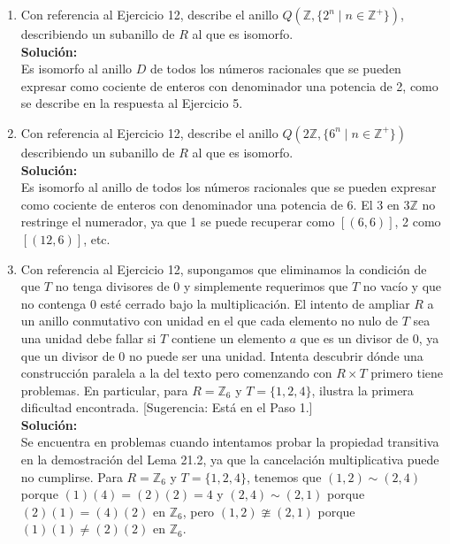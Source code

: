 \begin{enumerate}
	\item Con referencia al Ejercicio 12, describe el anillo \(Q(\mathbb{Z}, \{2^{n} \mid n \in \mathbb{Z}^+\})\), describiendo un subanillo de \(R\) al que es isomorfo.
	\\ \textbf{Solución:} \\
	Es isomorfo al anillo \(D\) de todos los números racionales que se pueden expresar como cociente de enteros con denominador una potencia de 2, como se describe en la respuesta al Ejercicio 5.
	
	\item Con referencia al Ejercicio 12, describe el anillo \(Q(2\mathbb{Z}, \{6^n \mid n \in \mathbb{Z}^+\})\) describiendo un subanillo de \(R\) al que es isomorfo.
	\\ \textbf{Solución:} \\
	Es isomorfo al anillo de todos los números racionales que se pueden expresar como cociente de enteros con denominador una potencia de 6. El 3 en \(3\mathbb{Z}\) no restringe el numerador, ya que 1 se puede recuperar como \( [(6, 6)] \), 2 como \( [(12, 6)] \), etc.
	\item Con referencia al Ejercicio 12, supongamos que eliminamos la condición de que \(T\) no tenga divisores de 0 y simplemente requerimos que \(T\) no vacío y que no contenga 0 esté cerrado bajo la multiplicación. El intento de ampliar \(R\) a un anillo conmutativo con unidad en el que cada elemento no nulo de \(T\) sea una unidad debe fallar si \(T\) contiene un elemento \(a\) que es un divisor de 0, ya que un divisor de 0 no puede ser una unidad. Intenta descubrir dónde una construcción paralela a la del texto pero comenzando con \(R \times T\) primero tiene problemas. En particular, para \(R = \mathbb{Z}_6\) y \(T = \{1, 2, 4\}\), ilustra la primera dificultad encontrada. [Sugerencia: Está en el Paso 1.]
	\\ \textbf{Solución:} \\
	Se encuentra en problemas cuando intentamos probar la propiedad transitiva en la demostración del Lema 21.2, ya que la cancelación multiplicativa puede no cumplirse. Para \(R = \mathbb{Z}_6\) y \(T = \{1, 2, 4\}\), tenemos que \( (1, 2) \sim (2, 4) \) porque \( (1)(4) = (2)(2) = 4 \) y \( (2, 4) \sim (2, 1) \) porque \( (2)(1) = (4)(2) \) en \(\mathbb{Z}_6\), pero \( (1, 2) \ncong (2, 1) \) porque \( (1)(1) \neq (2)(2) \) en \(\mathbb{Z}_6\). 
\end{enumerate}